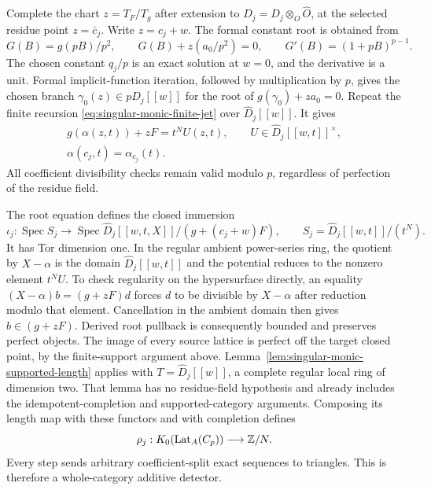 Complete the chart \(z=T_F/T_g\) after extension to
\(\widehat D_j=D_j\otimes_O\widehat O\), at the selected residue
point \(z=\bar c_j\).  Write \(z=c_j+w\).
The formal constant root is obtained from
\[
 G(B)=g(pB)/p^2,\qquad
 G(B)+z(a_0/p^2)=0,
 \qquad G'(B)=(1+pB)^{p-1}.
\]
The chosen constant \(q_j/p\) is an exact solution at \(w=0\),
and the derivative is a unit.  Formal implicit-function iteration,
followed by multiplication by \(p\), gives the chosen branch
\(\gamma_0(z)\in p\widehat D_j[[w]]\)
for the root of \(g(\gamma_0)+za_0=0\).
Repeat the finite recursion
\eqref{eq:singular-monic-finite-jet} over \(\widehat D_j[[w]]\).
It gives
\begin{equation}\label{eq:singular-monic-root-factorization}
\begin{gathered}
 g(\alpha(z,t))+zF=t^NU(z,t),\qquad
 U\in\widehat D_j[[w,t]]^\times,\\
 \alpha(c_j,t)=\alpha_{c_j}(t).
\end{gathered}
\end{equation}
All coefficient divisibility checks remain valid modulo \(p\),
regardless of perfection of the residue field.

The root equation defines the closed immersion
\begin{equation}\label{eq:singular-monic-root-section}
 \iota_j:\operatorname{Spec}S_j\longrightarrow
 \operatorname{Spec}\widehat D_j[[w,t,X]]/(g+(c_j+w)F),
 \qquad S_j=\widehat D_j[[w,t]]/(t^N).
\end{equation}
It has Tor dimension one.  In the regular ambient power-series ring,
the quotient by \(X-\alpha\) is the domain \(\widehat D_j[[w,t]]\)
and the potential reduces to the nonzero element \(t^NU\).
To check regularity on the hypersurface directly, an equality
\((X-\alpha)b=(g+zF)d\) forces \(d\) to be divisible by
\(X-\alpha\) after reduction modulo that element.  Cancellation
in the ambient domain then gives \(b\in(g+zF)\).
Derived root pullback is consequently bounded and preserves perfect
objects.
The image of every source lattice is perfect off the target
closed point, by the finite-support argument above.
Lemma~\ref{lem:singular-monic-supported-length} applies with
\(T=\widehat D_j[[w]]\), a complete regular local ring of
dimension two.  That lemma has no residue-field hypothesis and
already includes the idempotent-completion and supported-category
arguments.  Composing its length map with these functors and with
completion defines
\begin{equation}\label{eq:singular-monic-detector}
 \rho_j:K_0(\operatorname{Lat}_A(C_p))\longrightarrow\mathbb Z/N.
\end{equation}
Every step sends arbitrary coefficient-split exact sequences to
triangles.  This is therefore a whole-category additive detector.

